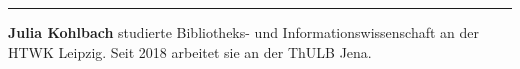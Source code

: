 \begin{center}\rule{0.5\linewidth}{0.5pt}\end{center}

\textbf{Julia Kohlbach} studierte Bibliotheks- und
Informationswissenschaft an der HTWK Leipzig. Seit 2018 arbeitet sie an
der ThULB Jena.

